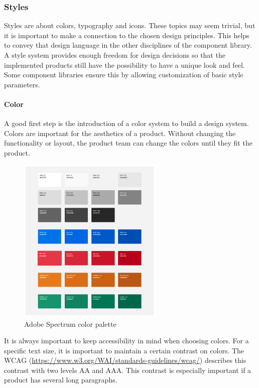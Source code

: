 \subsubsection{Styles}
Styles are about colors, typography and icons. These topics may seem trivial, but it is important to make a connection to the chosen design principles. This helps to convey that design language in the other disciplines of the component library. \\
A style system provides enough freedom for design decisions so that the implemented products still have the possibility to have a unique look and feel. Some component libraries ensure this by allowing customization of basic style parameters.\cite{vesselov_building_2019}

\paragraph{Color}
A good first step is the introduction of a color system to build a design system. Colors are important for the aesthetics of a product.
Without changing the functionality or layout, the product team can change the colors until they fit the product. \\
\begin{figure}[htbp]
	\centerline{\includegraphics[height=8cm]{images/adobe_spectrum_color_palette.png}}
	\caption{Adobe Spectrum color palette \cite{spectrum_adobe_spectrum_nodate}}
	\label{adobe_spectrum_colors}
\end{figure}
It is always important to keep accessibility in mind when choosing colors. For a specific text size, it is important to maintain a certain contrast on colors. The WCAG (\url{https://www.w3.org/WAI/standards-guidelines/wcag/}) describes this contrast with two levels AA and AAA. This contrast is especially important if a product has several long paragraphs.  \\
